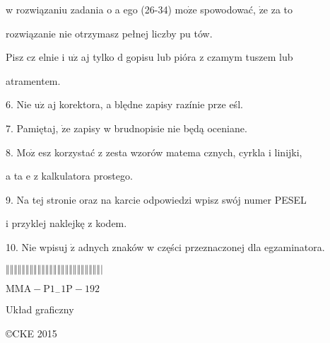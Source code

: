 \documentclass[a4paper,12pt]{article}
\begin{document}
w rozwiązaniu zadania o a ego (26-34) $\mathrm{m}\mathrm{o}\dot{\mathrm{z}}\mathrm{e}$ spowodować, $\dot{\mathrm{z}}\mathrm{e}$ za to

rozwiązanie nie otrzymasz pełnej liczby pu tów.

Pisz cz elnie i $\mathrm{u}\dot{\mathrm{z}}$ aj tylko $\mathrm{d}$ gopisu lub pióra z czamym tuszem lub

atramentem.

6. Nie $\mathrm{u}\dot{\mathrm{z}}$ aj korektora, a blędne zapisy razínie prze eśl.

7. Pamiętaj, $\dot{\mathrm{z}}\mathrm{e}$ zapisy w brudnopisie nie będą oceniane.

8. $\mathrm{M}\mathrm{o}\dot{\mathrm{z}}$ esz korzystać z zesta wzorów matema cznych, cyrkla i linijki,

a ta $\mathrm{e}$ z kalkulatora prostego.

9. Na tej stronie oraz na karcie odpowiedzi wpisz swój numer PESEL

i przyklej naklejkę z kodem.

10. Nie wpisuj $\dot{\mathrm{z}}$ adnych znaków w części przeznaczonej dla egzaminatora.

$\Vert\Vert\Vert\Vert\Vert\Vert\Vert\Vert\Vert\Vert\Vert\Vert\Vert\Vert\Vert\Vert\Vert\Vert\Vert\Vert\Vert\Vert\Vert\Vert|$

$\mathrm{M}\mathrm{M}\mathrm{A}-\mathrm{P}1_{-}1\mathrm{P}-192$

Układ graficzny

\copyright CKE 2015
\end{document}
